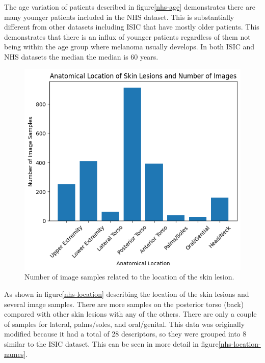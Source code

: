 The age variation of patients described in figure\ref{nhs-age} demonstrates there are many younger patients included in the NHS dataset. This is substantially different from other datasets including ISIC that have mostly older patients. This demonstrates that there is an influx of younger patients regardless of them not being within the age group where melanoma usually develops. In both ISIC and NHS datasets the median the median is 60 years.

\begin{figure}
	\centering
	\includegraphics[scale=0.75]{images/nhs/nhs-location.png}
	\caption{Number of image samples related to the location of the skin lesion.}
\end{figure}\label{nhs-location}

As shown in figure\ref{nhs-location} describing the location of the skin lesions and several image samples. There are more samples on the posterior torso (back) compared with other skin lesions with any of the others. There are only a couple of samples for lateral, palms/soles, and oral/genital. This data was originally modified because it had a total of 28 descriptors, so they were grouped into 8 similar to the ISIC dataset. This can be seen in more detail in figure\ref{nhs-location-names}.

